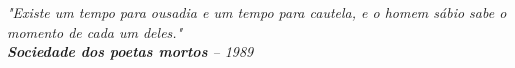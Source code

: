 \begin{epigrafe}
\vspace*{\fill}
\begin{flushright}
\emph{"Existe um tempo para ousadia e um tempo para cautela, e o homem sábio sabe o momento de cada um deles." 
  \\ \textbf{Sociedade dos poetas mortos} -- 1989}
\end{flushright}
\end{epigrafe}
